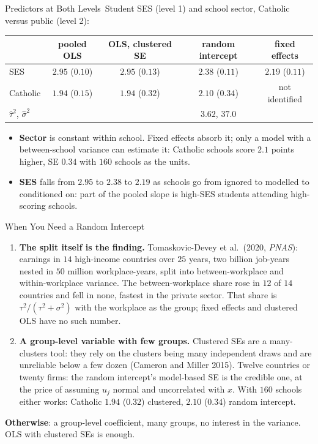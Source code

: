 \documentclass[aspectratio=169,11pt,xcolor=dvipsnames]{beamer}
\newcommand{\srcp}[1]{{\scriptsize\color{gray}(#1)}}
\newcommand{\core}{\,\raisebox{0.6pt}{\textcolor{corestar}{$\bigstar$}}}
\begin{document}
\begin{frame}{Predictors at Both Levels\core}
Student SES (level 1) and school sector, Catholic versus public (level 2):
\begin{center}\small
\renewcommand{\arraystretch}{1.05}
\begin{tabular}{lcccc}
\toprule
 & pooled OLS & OLS, clustered SE & random intercept & fixed effects \\
\midrule
SES & $2.95$ ($0.10$) & $2.95$ ($0.13$) & $2.38$ ($0.11$) & $2.19$ ($0.11$) \\
Catholic & $1.94$ ($0.15$) & $1.94$ ($0.32$) & $2.10$ ($0.34$) & not identified \\
$\hat\tau^2$, $\hat\sigma^2$ & & & $3.62$, $37.0$ & \\
\bottomrule
\end{tabular}
\end{center}
\begin{itemize}\itemsep3pt
  \item \textbf{Sector} is constant within school. Fixed effects absorb
        it; only a model with a between-school variance can estimate it:
        Catholic schools score $2.1$ points higher, SE $0.34$ with $160$
        schools as the units.
  \item \textbf{SES} falls from $2.95$ to $2.38$ to $2.19$ as schools go
        from ignored to modelled to conditioned on: part of the pooled
        slope is high-SES students attending high-scoring schools.
\end{itemize}
\end{frame}

\begin{frame}{When You Need a Random Intercept\core}
\begin{enumerate}\itemsep3pt
  \item \textbf{The split itself is the finding.} Tomaskovic-Devey et al.\
        (2020, \emph{PNAS}): earnings in $14$ high-income countries over
        $25$ years, two billion job-years nested in $50$ million
        workplace-years, split into between-workplace and within-workplace
        variance. The between-workplace share rose in $12$ of $14$
        countries and fell in none, fastest in the private sector. That
        share is $\tau^2/(\tau^2 + \sigma^2)$ with the workplace as the
        group; fixed effects and clustered OLS have no such number.
  \item \textbf{A group-level variable with few groups.} Clustered SEs
        are a many-clusters tool: they rely on the clusters being many
        independent draws and are unreliable below a few dozen
        \srcp{Cameron and Miller 2015}. Twelve countries or twenty firms:
        the random intercept's model-based SE is the credible one, at the
        price of assuming $u_j$ normal and uncorrelated with $x$. With
        $160$ schools either works: Catholic $1.94$ ($0.32$) clustered,
        $2.10$ ($0.34$) random intercept.
\end{enumerate}
\vskip4pt
\textbf{Otherwise}: a group-level coefficient, many groups, no interest in
the variance. OLS with clustered SEs is enough.
\end{frame}
\end{document}

